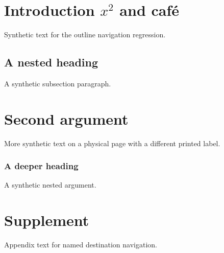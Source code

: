 \documentclass{article}
\begin{document}
\section{Introduction \texorpdfstring{$x^2$}{x²} and café}
Synthetic text for the outline navigation regression.
\subsection{A nested heading}
A synthetic subsection paragraph.
\newpage
{}
\section{Second argument}
More synthetic text on a physical page with a different printed label.
\subsubsection{A deeper heading}
A synthetic nested argument.
\newpage
\appendix
\section{Supplement}
Appendix text for named destination navigation.
\end{document}
